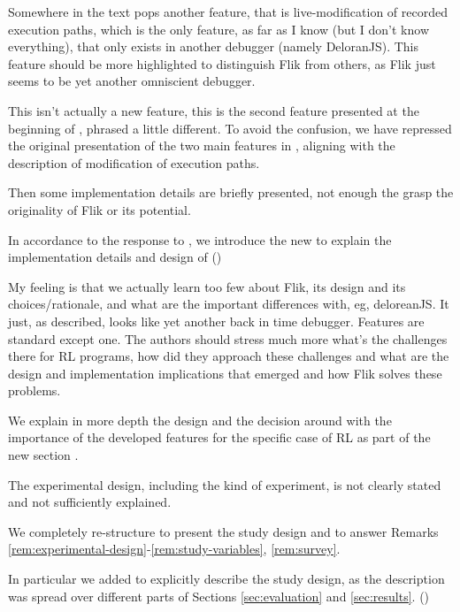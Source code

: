 \begin{remark}\label{rem:features2}
Somewhere in the text pops another feature, that is live-modification of recorded execution paths, which is the only feature, as far as I know (but I don't know everything), that only exists in another debugger (namely DeloranJS). This feature should be more highlighted to distinguish Flik from others, as Flik just seems to be yet another omniscient debugger.
\end{remark}
\begin{clarify}
This isn't actually a new feature, this is the second feature presented at the beginning of , phrased a little different. To avoid the confusion, we have repressed the original presentation of the two main features in \flik, aligning with the description of modification of execution paths.
\end{clarify}

\begin{remark} \label{rem:implementation2}
Then some implementation details are briefly presented, not enough the grasp the originality of Flik or its potential.
\end{remark}
\begin{solved}
In accordance to the response to , we introduce the new  to explain the implementation details and design of \flik ()
\end{solved}

\begin{remark} \label{rem:delorean}
My feeling is that we actually learn too few about Flik, its design and its choices/rationale, and what are the important differences with, eg, deloreanJS.
It just, as described, looks like yet another back in time debugger. Features are standard except one. The authors should stress much more what's the challenges there for RL programs, how did they approach these challenges and what are the design and implementation implications that emerged and how Flik solves these problems.
\end{remark}
\begin{solved}
We explain in more depth the design and the decision around \flik with the importance of the developed features for the specific case of \ac{RL} as part of the new section .
\end{solved}

\begin{remark}\label{rem:experimental-design}
The experimental design, including the kind of experiment, is not clearly stated and not sufficiently explained.
\end{remark}
\begin{solved}
We completely re-structure  to present the study design and to answer Remarks \ref{rem:experimental-design}-\ref{rem:study-variables}, \ref{rem:survey}.

In particular we added  to explicitly describe the study design, as the description was spread over different parts of Sections \ref{sec:evaluation} and \ref{sec:results}. ()
\end{solved}

